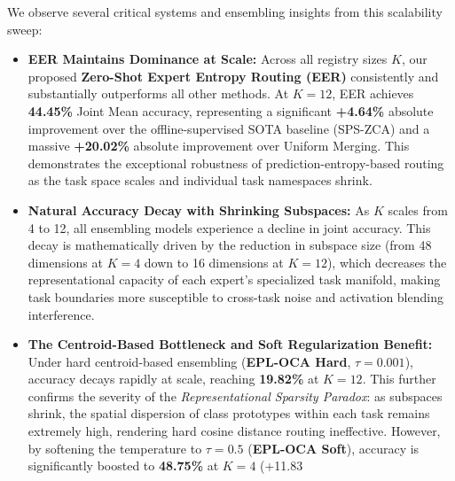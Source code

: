 We observe several critical systems and ensembling insights from this scalability sweep:
\begin{itemize}
    \item \textbf{EER Maintains Dominance at Scale:} Across all registry sizes $K$, our proposed \textbf{Zero-Shot Expert Entropy Routing (EER)} consistently and substantially outperforms all other methods. At $K=12$, EER achieves \textbf{44.45\%} Joint Mean accuracy, representing a significant \textbf{+4.64\%} absolute improvement over the offline-supervised SOTA baseline (SPS-ZCA) and a massive \textbf{+20.02\%} absolute improvement over Uniform Merging. This demonstrates the exceptional robustness of prediction-entropy-based routing as the task space scales and individual task namespaces shrink.
    \item \textbf{Natural Accuracy Decay with Shrinking Subspaces:} As $K$ scales from 4 to 12, all ensembling models experience a decline in joint accuracy. This decay is mathematically driven by the reduction in subspace size (from 48 dimensions at $K=4$ down to 16 dimensions at $K=12$), which decreases the representational capacity of each expert's specialized task manifold, making task boundaries more susceptible to cross-task noise and activation blending interference.
    \item \textbf{The Centroid-Based Bottleneck and Soft Regularization Benefit:} Under hard centroid-based ensembling (\textbf{EPL-OCA Hard}, $\tau = 0.001$), accuracy decays rapidly at scale, reaching \textbf{19.82\%} at $K=12$. This further confirms the severity of the \emph{Representational Sparsity Paradox}: as subspaces shrink, the spatial dispersion of class prototypes within each task remains extremely high, rendering hard cosine distance routing ineffective. However, by softening the temperature to $\tau=0.5$ (\textbf{EPL-OCA Soft}), accuracy is significantly boosted to \textbf{48.75\%} at $K=4$ (+11.83%
\end{itemize}

